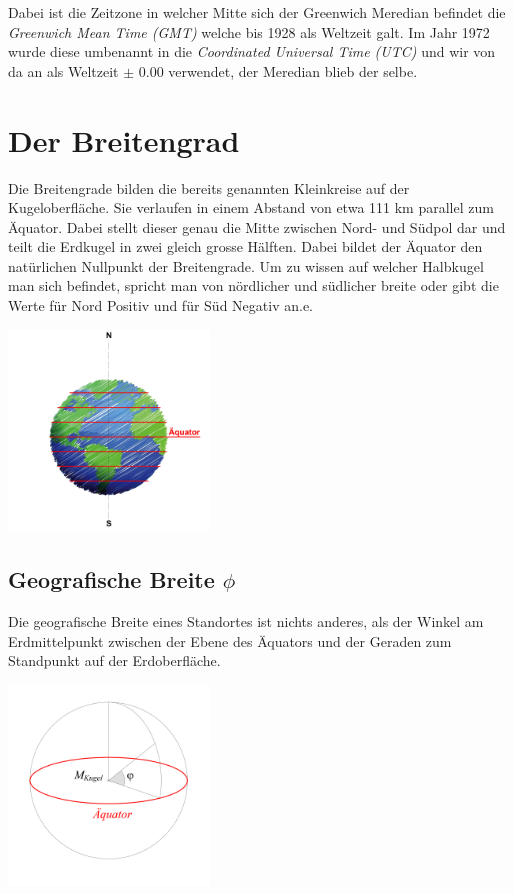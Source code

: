 \begin{refsection}
Dabei ist die Zeitzone in welcher Mitte sich der Greenwich Meredian befindet die \textit{Greenwich Mean Time (GMT)} welche bis 1928 als Weltzeit galt. Im Jahr 1972 wurde diese umbenannt in die \textit{Coordinated Universal Time (UTC)} und wir von da an als Weltzeit $\pm$ 0.00 verwendet, der Meredian blieb der selbe.


\section{Der Breitengrad}
Die Breitengrade bilden die bereits genannten Kleinkreise auf der Kugeloberfläche. Sie verlaufen in einem Abstand von etwa 111 km parallel zum Äquator. Dabei stellt dieser genau die Mitte zwischen Nord- und Südpol dar und teilt die Erdkugel in zwei gleich grosse Hälften. Dabei bildet der Äquator den natürlichen Nullpunkt der Breitengrade. Um zu wissen auf welcher Halbkugel man sich befindet, spricht man von nördlicher und südlicher breite oder gibt die Werte für Nord Positiv und für Süd Negativ an.e.

\begin{center}
        \includegraphics[width=0.4\textwidth]{kugel/BreiteErdkugel.jpg}
\end{center}


\subsection{Geografische Breite $\phi$}
\begin{definition}
Die geografische Breite eines Standortes ist nichts anderes, als der Winkel am Erdmittelpunkt zwischen der Ebene des Äquators und der Geraden zum Standpunkt auf der Erdoberfläche.
\end{definition}

\begin{center}
        \includegraphics[width=0.4\textwidth]{kugel/GeografischeBreite.jpg}
\end{center}



\end{refsection}
